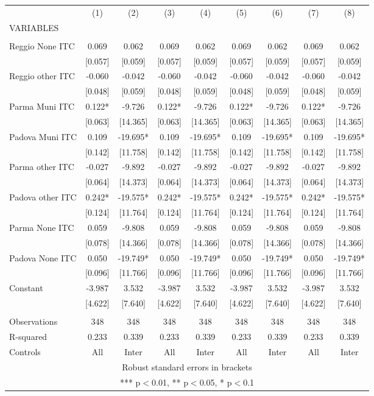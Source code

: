\begin{tabular}{lcccccccc} \hline
 & (1) & (2) & (3) & (4) & (5) & (6) & (7) & (8) \\
VARIABLES &  &  &  &  &  &  &  &  \\ \hline
 &  &  &  &  &  &  &  &  \\
Reggio None ITC & 0.069 & 0.062 & 0.069 & 0.062 & 0.069 & 0.062 & 0.069 & 0.062 \\
 & [0.057] & [0.059] & [0.057] & [0.059] & [0.057] & [0.059] & [0.057] & [0.059] \\
Reggio other ITC & -0.060 & -0.042 & -0.060 & -0.042 & -0.060 & -0.042 & -0.060 & -0.042 \\
 & [0.048] & [0.059] & [0.048] & [0.059] & [0.048] & [0.059] & [0.048] & [0.059] \\
Parma Muni ITC & 0.122* & -9.726 & 0.122* & -9.726 & 0.122* & -9.726 & 0.122* & -9.726 \\
 & [0.063] & [14.365] & [0.063] & [14.365] & [0.063] & [14.365] & [0.063] & [14.365] \\
Padova Muni ITC & 0.109 & -19.695* & 0.109 & -19.695* & 0.109 & -19.695* & 0.109 & -19.695* \\
 & [0.142] & [11.758] & [0.142] & [11.758] & [0.142] & [11.758] & [0.142] & [11.758] \\
Parma other ITC & -0.027 & -9.892 & -0.027 & -9.892 & -0.027 & -9.892 & -0.027 & -9.892 \\
 & [0.064] & [14.373] & [0.064] & [14.373] & [0.064] & [14.373] & [0.064] & [14.373] \\
Padova other ITC & 0.242* & -19.575* & 0.242* & -19.575* & 0.242* & -19.575* & 0.242* & -19.575* \\
 & [0.124] & [11.764] & [0.124] & [11.764] & [0.124] & [11.764] & [0.124] & [11.764] \\
Parma None ITC & 0.059 & -9.808 & 0.059 & -9.808 & 0.059 & -9.808 & 0.059 & -9.808 \\
 & [0.078] & [14.366] & [0.078] & [14.366] & [0.078] & [14.366] & [0.078] & [14.366] \\
Padova None ITC & 0.050 & -19.749* & 0.050 & -19.749* & 0.050 & -19.749* & 0.050 & -19.749* \\
 & [0.096] & [11.766] & [0.096] & [11.766] & [0.096] & [11.766] & [0.096] & [11.766] \\
Constant & -3.987 & 3.532 & -3.987 & 3.532 & -3.987 & 3.532 & -3.987 & 3.532 \\
 & [4.622] & [7.640] & [4.622] & [7.640] & [4.622] & [7.640] & [4.622] & [7.640] \\
 &  &  &  &  &  &  &  &  \\
Observations & 348 & 348 & 348 & 348 & 348 & 348 & 348 & 348 \\
R-squared & 0.233 & 0.339 & 0.233 & 0.339 & 0.233 & 0.339 & 0.233 & 0.339 \\
 Controls & All & Inter & All & Inter & All & Inter & All & Inter \\ \hline
\multicolumn{9}{c}{ Robust standard errors in brackets} \\
\multicolumn{9}{c}{ *** p$<$0.01, ** p$<$0.05, * p$<$0.1} \\
\end{tabular}
